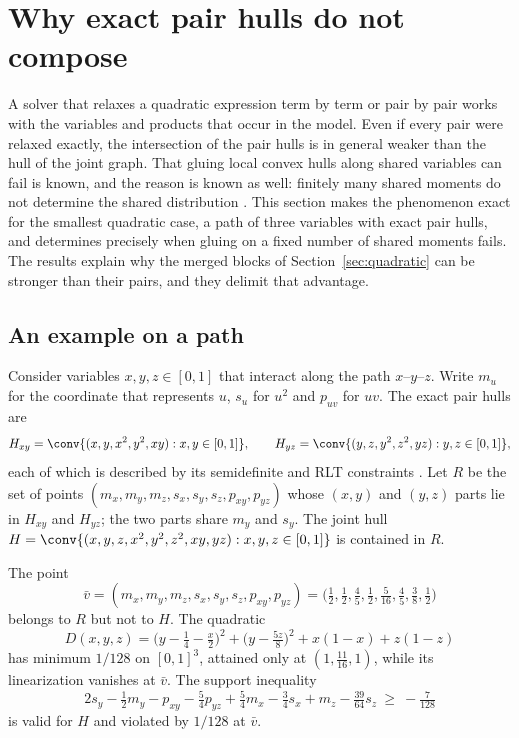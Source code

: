 \section{Why exact pair hulls do not compose}\label{sec:composition}

A solver that relaxes a quadratic expression term by term or pair by
pair works with the variables and products that occur in the model. Even
if every pair were relaxed exactly, the intersection of the pair hulls is
in general weaker than the hull of the joint graph. That gluing local
convex hulls along shared variables can fail is known, and the reason is
known as well: finitely many shared moments do not determine the shared
distribution \citep{Lasserre2006,NieDemmel2009,FantuzziFuentes2025}. This
section makes the phenomenon exact for the smallest quadratic case, a
path of three variables with exact pair hulls, and determines precisely
when gluing on a fixed number of shared moments fails. The results
explain why the merged blocks of Section~\ref{sec:quadratic} can be
stronger than their pairs, and they delimit that advantage.

\subsection{An example on a path}\label{sec:path-example}

Consider variables $x,y,z\in[0,1]$ that interact along the path
$x$--$y$--$z$. Write $m_u$ for the coordinate that represents $u$, $s_u$
for $u^2$ and $p_{uv}$ for $uv$. The exact pair hulls are
\[
H_{xy}=\conv\{(x,y,x^2,y^2,xy):x,y\in[0,1]\},\qquad
H_{yz}=\conv\{(y,z,y^2,z^2,yz):y,z\in[0,1]\},
\]
each of which is described by its semidefinite and RLT constraints
\citep{AnstreicherBurer2010}. Let $R$ be the set of points
$(m_x,m_y,m_z,s_x,s_y,s_z,p_{xy},p_{yz})$ whose $(x,y)$ and $(y,z)$ parts
lie in $H_{xy}$ and $H_{yz}$; the two parts share $m_y$ and $s_y$. The
joint hull $H=\conv\{(x,y,z,x^2,y^2,z^2,xy,yz):x,y,z\in[0,1]\}$ is
contained in $R$.

\begin{proposition}\label{prop:path-gap}
The point
\begin{equation}\label{eq:witness}
\bar v=(m_x,m_y,m_z,s_x,s_y,s_z,p_{xy},p_{yz})
=\bigl(\tfrac12,\tfrac12,\tfrac45,\tfrac12,\tfrac5{16},\tfrac45,\tfrac38,\tfrac12\bigr)
\end{equation}
belongs to $R$ but not to $H$. The quadratic
\begin{equation}\label{eq:D-example}
D(x,y,z)=\bigl(y-\tfrac14-\tfrac x2\bigr)^2+\bigl(y-\tfrac{5z}8\bigr)^2+x(1-x)+z(1-z)
\end{equation}
has minimum $1/128$ on $[0,1]^3$, attained only at $(1,\tfrac{11}{16},1)$,
while its linearization vanishes at $\bar v$. The support inequality
\begin{equation}\label{eq:path-cut}
2s_y-\tfrac12m_y-p_{xy}-\tfrac54p_{yz}+\tfrac54m_x-\tfrac34s_x+m_z-\tfrac{39}{64}s_z\ \ge\ -\tfrac7{128}
\end{equation}
is valid for $H$ and violated by $1/128$ at $\bar v$.
\end{proposition}

